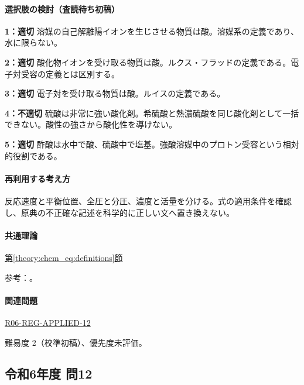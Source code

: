 \paragraph{選択肢の検討（査読待ち初稿）}\mbox{}\par

\noindent\textbf{1：適切} 溶媒の自己解離陽イオンを生じさせる物質は酸。溶媒系の定義であり、水に限らない。\par

\noindent\textbf{2：適切} 酸化物イオンを受け取る物質は酸。ルクス・フラッドの定義である。電子対受容の定義とは区別する。\par

\noindent\textbf{3：適切} 電子対を受け取る物質は酸。ルイスの定義である。\par

\noindent\textbf{4：不適切} 硫酸は非常に強い酸化剤。希硫酸と熱濃硫酸を同じ酸化剤として一括できない。酸性の強さから酸化性を導けない。\par

\noindent\textbf{5：適切} 酢酸は水中で酸、硫酸中で塩基。強酸溶媒中のプロトン受容という相対的役割である。\par

\paragraph{再利用する考え方} 反応速度と平衡位置、全圧と分圧、濃度と活量を分ける。式の適用条件を確認し、原典の不正確な記述を科学的に正しい文へ置き換えない。

\paragraph{共通理論} \hyperref[theory:chem_eq:definitions]{第\ref*{theory:chem_eq:definitions}節}

\par 参考：\cite{iupac_greenbook2012}。

\paragraph{関連問題} \hyperref[q:r06-reg-applied-12]{R06-REG-APPLIED-12}

\par 難易度 2（校準初稿）、優先度未評価。

\subsection{令和6年度 問12}
\label{q:r06-reg-applied-12}

